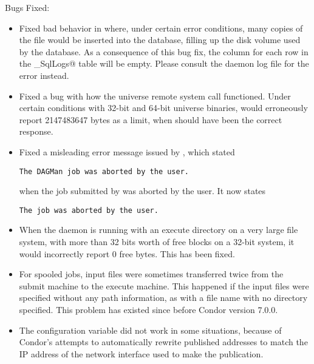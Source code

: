 \noindent Bugs Fixed:

\begin{itemize}

\item Fixed bad behavior in  where, under certain error
conditions, many copies of the  file would be
inserted into the database, filling up the disk volume used by the
database. As a consequence of this bug fix, the \verb@LogBody@ column
for each row in the \verb@Error_SqlLogs@ table will be empty. Please
consult the  daemon log file for the error instead.

\item Fixed a bug with how the  universe 
remote system call  functioned.
Under certain conditions with
32-bit and 64-bit  universe binaries,
 would erroneously report 2147483647 bytes as a limit,
when  should have been the correct response.

\item Fixed a misleading error message issued by ,
which stated
\begin{verbatim}
The DAGMan job was aborted by the user.
\end{verbatim}
when the job submitted by  was aborted by the user.
It now states 
\begin{verbatim}
The job was aborted by the user.
\end{verbatim}

\item When the  daemon is running with an execute directory on
a very large file system, with more than 32 bits worth of free blocks
on a 32-bit system, it would incorrectly report 0 free bytes.  This
has been fixed.

\item For spooled jobs, input files were sometimes transferred twice from
the submit machine to the execute machine.  This happened if the input files
were specified without any path information,
as with a file name with no directory specified.
This problem has existed since before Condor version 7.0.0.

\item The configuration variable  did not
work in some situations, because of Condor's attempts to
automatically rewrite published addresses to match the IP address of
the network interface used to make the publication.


\end{itemize}
